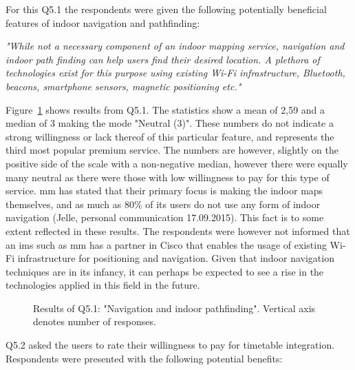 For this Q5.1 the respondents were given the following potentially beneficial features of indoor navigation and pathfinding:

\begin{displayquote}
\textit{"While not a necessary component of an indoor mapping service, navigation and indoor path finding can help users find their desired location. A plethora of technologies exist for this purpose using existing Wi-Fi infrastructure, Bluetooth, beacons, smartphone sensors, magnetic positioning etc."}
\end{displayquote}

Figure~\ref{fig:q51} shows results from Q5.1. The statistics show a mean of 2,59 and a median of 3 making the mode "Neutral (3)". These numbers do not indicate a strong willingness or lack thereof of this particular feature, and represents the third most popular premium service. The numbers are however, slightly on the positive side of the scale with a non-negative median, however there were equally many neutral as there were those with low willingness to pay for this type of service. \gls{mm} has stated that their primary focus is making the indoor maps themselves, and as much as 80\% of its users do not use any form of indoor navigation (Jelle, personal communication 17.09.2015). This fact is to some extent reflected in these results. The respondents were however not informed that an \gls{ims} such as \gls{mm} has a partner in Cisco that enables the usage of existing Wi-Fi infrastructure for positioning and navigation. Given that indoor navigation techniques are in its infancy, it can perhaps be expected to see a rise in the technologies applied in this field in the future. 

\begin{figure}[H]
    \centering
    \caption{Results of Q5.1: "Navigation and indoor pathfinding". Vertical axis denotes number of responses.}
    \label{fig:q51}
\end{figure}

Q5.2 asked the users to rate their willingness to pay for timetable integration. Respondents were presented with the following potential benefits:

